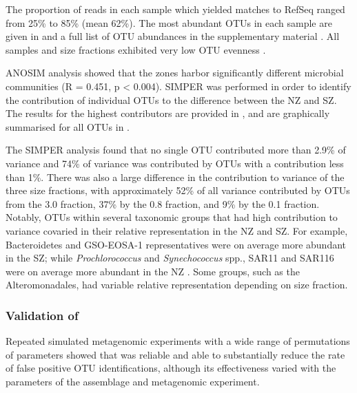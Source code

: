 The proportion of reads in each sample which yielded matches to RefSeq ranged from 25\% to 85\% (mean 62\%).
The most abundant \acp{OTU} in each sample are given in  and a full list of \ac{OTU} abundances in the supplementary material .
All samples and size fractions exhibited very low \ac{OTU} evenness .




\ac{ANOSIM} analysis showed that the zones harbor significantly different microbial communities (R = 0.451, p < 0.004). 
\ac{SIMPER} was performed in order to identify the contribution of individual \acp{OTU} to the difference between the \ac{NZ} and \ac{SZ}. 
The results for the highest contributors are provided in , and are graphically summarised for all \acp{OTU} in .




The \ac{SIMPER} analysis found that no single \ac{OTU} contributed more than 2.9\% of variance and 74\% of variance was contributed by \acp{OTU} with a contribution less than 1\%. 
There was also a large difference in the contribution to variance of the three size fractions, with approximately 52\% of all variance contributed by \acp{OTU} from the 3.0 \micron{} fraction, 37\% by the 0.8 \micron{} fraction, and 9\% by the 0.1 \micron{} fraction.
Notably, \acp{OTU} within several taxonomic groups that had high contribution to variance covaried in their relative representation in the \ac{NZ} and \ac{SZ}.
For example, Bacteroidetes and GSO-EOSA-1 representatives were on average more abundant in the \ac{SZ}; while \emph{Prochlorococcus} and \emph{Synechococcus} spp., SAR11 and SAR116 were on average more abundant in the \ac{NZ} .
Some groups, such as the Alteromonadales, had variable relative representation depending on size fraction.

\subsubsection{Validation of }

Repeated simulated metagenomic experiments with a wide range of permutations of parameters showed that  was reliable and able to substantially reduce the rate of false positive \ac{OTU} identifications, although its effectiveness varied with the parameters of the assemblage and metagenomic experiment.

